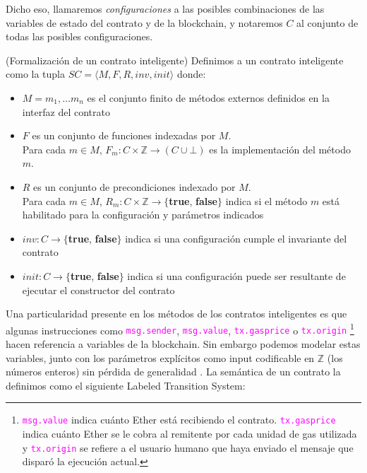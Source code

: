 Dicho eso, llamaremos \textit{configuraciones} a las posibles combinaciones de las variables de estado del contrato y de la blockchain, y notaremos $C$ al conjunto de todas las posibles configuraciones.

\begin{definition}(Formalización de un contrato inteligente)
    \label{definicion-smart-contract}
    Definimos a un contrato inteligente como la tupla $SC = \langle M, F, R, inv, init \rangle$ donde:

    \begin{itemize}
        \item $M = {m_1, \dots m_n}$ es el conjunto finito de métodos externos definidos en la interfaz del contrato
        \item $F$ es un conjunto de funciones indexadas por $M$. \\
              Para cada $m \in M$, $F_m : C \times \mathds{Z} \rightarrow (C \cup \bot)$ es la implementación del método $m$.
        \item $R$ es un conjunto de precondiciones indexado por $M$.\\
              Para cada $m \in M$, $R_m : C \times \mathds{Z} \rightarrow \{$\textbf{true}, \textbf{false}$\}$ indica si el método $m$ está habilitado para la configuración y parámetros indicados
        \item $inv : C \rightarrow \{$\textbf{true}, \textbf{false}$\}$ indica si una configuración cumple el invariante del contrato
        \item $init : C \rightarrow \{$\textbf{true}, \textbf{false}$\}$ indica si una configuración puede ser resultante de ejecutar el constructor del contrato
    \end{itemize}
\end{definition}

Una particularidad presente en los métodos de los contratos inteligentes es que algunas instrucciones como \textcolor{magenta}{\texttt{msg.sender}}, \textcolor{magenta}{\texttt{msg.value}}, \textcolor{magenta}{\texttt{tx.gasprice}} o \textcolor{magenta}{\texttt{tx.origin}}
\footnote{\textcolor{magenta}{\texttt{msg.value}} indica cuánto Ether está recibiendo el contrato. \textcolor{magenta}{\texttt{tx.gasprice}} indica cuánto Ether se le cobra al remitente por cada unidad de gas utilizada y \textcolor{magenta}{\texttt{tx.origin}} se refiere a el usuario humano que haya enviado el mensaje que disparó la ejecución actual.} hacen referencia a variables de la blockchain.
Sin embargo podemos modelar estas variables, junto con los parámetros explícitos como input codificable en $\mathds{Z}$ (los números enteros) sin pérdida de generalidad \cite{de-caso-epa}.
La semántica de un contrato la definimos como el siguiente Labeled Transition System:

